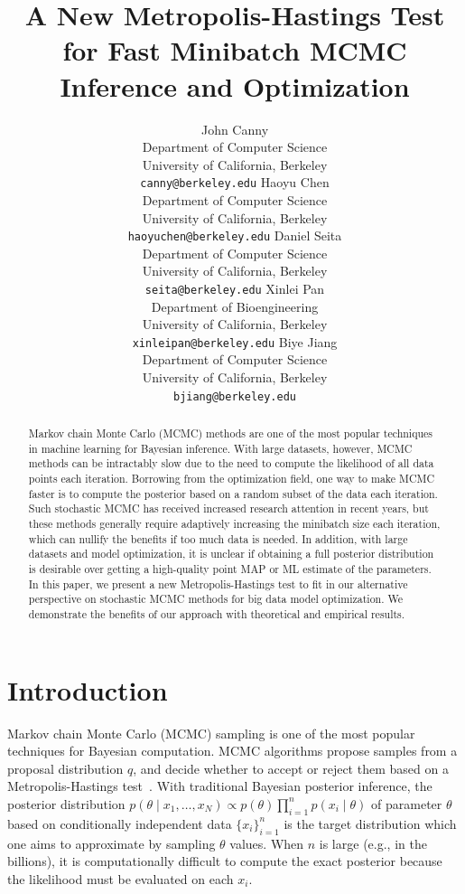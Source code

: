 \documentclass{article}
\title{A New Metropolis-Hastings Test for Fast Minibatch MCMC Inference and Optimization}
\author{
  John Canny \\
  Department of Computer Science \\
  University of California, Berkeley \\
  \texttt{canny@berkeley.edu}
  \And
  Haoyu Chen \\
  Department of Computer Science \\
  University of California, Berkeley \\
  \texttt{haoyuchen@berkeley.edu}
  \And
  Daniel Seita \\
  Department of Computer Science \\
  University of California, Berkeley \\
  \texttt{seita@berkeley.edu}
  \And
  Xinlei Pan \\
  Department of Bioengineering \\
  University of California, Berkeley \\
  \texttt{xinleipan@berkeley.edu}
  \And 
  Biye Jiang \\
  Department of Computer Science \\
  University of California, Berkeley \\
  \texttt{bjiang@berkeley.edu}
}
\begin{document}

\maketitle

\begin{abstract}
Markov chain Monte Carlo (MCMC) methods are one of the most popular techniques in machine learning
for Bayesian inference. With large datasets, however, MCMC methods can be intractably slow due to
the need to compute the likelihood of all data points each iteration. Borrowing from the
optimization field, one way to make MCMC faster is to compute the posterior based on a random subset
of the data each iteration. Such stochastic MCMC has received increased research attention in recent
years, but these methods generally require adaptively increasing the minibatch size each iteration,
which can nullify the benefits if too much data is needed. In addition, with large datasets and
model optimization, it is unclear if obtaining a full posterior distribution is desirable over
getting a high-quality point MAP or ML estimate of the parameters.  In this paper, we present a new
Metropolis-Hastings test to fit in our alternative perspective on stochastic MCMC methods for big
data model optimization. We demonstrate the benefits of our approach with theoretical and empirical
results.
\end{abstract}



\section{Introduction}\label{sec:introduction}

Markov chain Monte Carlo (MCMC) sampling is one of the most popular techniques for Bayesian
computation. MCMC algorithms propose samples from a proposal distribution $q$, and decide whether to
accept or reject them based on a Metropolis-Hastings test~\cite{Metropolis1953,hastings70}. With
traditional Bayesian posterior inference, the posterior distribution $p(\theta \mid x_1, \ldots,
x_N) \propto p(\theta)\prod_{i=1}^np(x_i \mid \theta)$ of parameter $\theta$ based on conditionally
independent data $\{x_i\}_{i=1}^n$ is the target distribution which one aims to approximate by
sampling $\theta$ values. When $n$ is large (e.g., in the billions), it is computationally difficult
to compute the exact posterior because the likelihood must be evaluated on each $x_i$.
\end{document}
